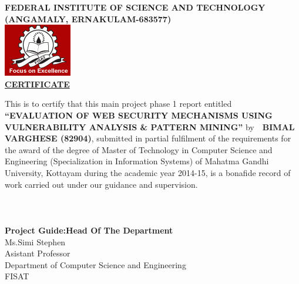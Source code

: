 \begin{center}
\renewcommand{\baselinestretch}{1.5} 
 \textbf{FEDERAL INSTITUTE OF SCIENCE AND TECHNOLOGY}\\
 \textbf{(ANGAMALY, ERNAKULAM-683577)}\\[2\baselineskip]
  \includegraphics[scale=1.1] {fisat.jpg} \\[2\baselineskip]
 \underline{\textbf{CERTIFICATE}} \\[2\baselineskip]
 \end{center}
\vspace{1cm}
This is to certify that this main project phase 1 report  entitled \textbf{``EVALUATION OF WEB SECURITY MECHANISMS
	USING VULNERABILITY ANALYSIS \& PATTERN MINING''} by $ $ $  $ \textbf{BIMAL VARGHESE (82904)},  submitted in partial fulfilment of the requirements for the award of the degree of Master of Technology in Computer Science and Engineering (Specialization in Information Systems) of Mahatma Gandhi University, Kottayam during the academic year 2014-15, is a bonafide record of work carried out under our guidance and supervision.
\\\\\\\\
\textbf{Project Guide:}\hspace*{7cm}\textbf{Head Of The Department}\\
\small{Ms.Simi Stephen}\\
\small{Asistant Professor}\\
\small{Department of Computer Science and Engineering }\\
\small{FISAT}\\
 
